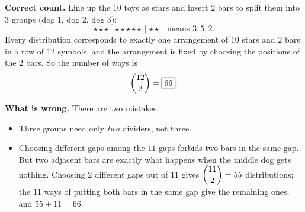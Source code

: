 \textbf{Correct count.} Line up the $10$ toys as stars and insert $2$ bars to split them into $3$ groups (dog $1$, dog $2$, dog $3$):
\[\star\star\star\,|\,\star\star\star\star\star\,|\,\star\star\quad\text{means }3,5,2 .\]
Every distribution corresponds to exactly one arrangement of $10$ stars and $2$ bars in a row of $12$ symbols, and the arrangement is fixed by choosing the positions of the $2$ bars. So the number of ways is
\[\dbinom{12}{2}=\boxed{66}.\]

\textbf{What is wrong.} There are two mistakes.
\begin{itemize}
\item Three groups need only \emph{two} dividers, not three.
\item Choosing different gaps among the $11$ gaps forbids two bars in the same gap. But two adjacent bars are exactly what happens when the middle dog gets nothing. Choosing $2$ different gaps out of $11$ gives $\dbinom{11}{2}=55$ distributions; the $11$ ways of putting both bars in the same gap give the remaining ones, and $55+11=66$.
\end{itemize}
